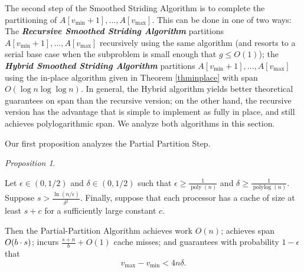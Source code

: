 \documentclass[11pt]{article}
\DeclarePairedDelimiter{\paren}{(}{)}
\newcommand{\poly}{\operatorname{poly}}
\newcommand{\polylog}{\operatorname{polylog}}
\newcommand{\defn}[1]{{\textit{\textbf{\boldmath #1}}} }
\renewcommand{\paragraph}[1]{\vspace{0.09in}\noindent{\bf \boldmath #1.}}
\theoremstyle{remark}
\newtheorem{proposition}[thm]{Proposition}
\theoremstyle{remark}
\begin{document}
The second step of the Smoothed Striding Algorithm is to complete the
partitioning of $A[v_{\text{min}} + 1], \ldots, A[v_{\text{max}}]$. This can be done
in one of two ways: The \defn{Recursive Smoothed Striding Algorithm}
partitions $A[v_{\text{min}} + 1], \ldots, A[v_{\text{max}}]$ recursively using the
same algorithm (and resorts to a serial base case when the subproblem
is small enough that $g \le O(1)$); the \defn{Hybrid Smoothed Striding
  Algorithm} partitions $A[v_{\text{min}} + 1], \ldots, A[v_{\text{max}}]$ using the
in-place algorithm given in Theorem \ref{thminplace} with span $O(\log
n \log \log n)$. In general, the Hybrid algorithm yields better
theoretical guarantees on span than the recursive version; on the
other hand, the recursive version has the advantage that is
simple to implement as fully in place, and still achieves
polylogarithmic span. We analyze both algorithms in this section.



\paragraph{Algorithm Analysis} Our first proposition analyzes the Partial Partition Step.
\begin{proposition}
  \label{prop:generalResult}
  
  Let $\epsilon \in (0, 1/2)$ and $\delta \in (0, 1/2)$ such that
  $\epsilon \ge \frac{1}{\poly(n)}$ and $\delta \ge
  \frac{1}{\polylog(n)}$. Suppose $s > \frac{\ln
    (n/\epsilon)}{\delta^2}$. Finally, suppose that each processor has
  a cache of size at least $s + c$ for a sufficiently large constant
  $c$.

  Then the Partial-Partition Algorithm achieves work $O(n)$; achieves
  span $O\paren*{b \cdot s}$; incurs $\frac{s+n}{b} + O(1)$ cache
  misses; and guarantees with probability $1 - \epsilon$ that
  $$v_{\text{max}}-v_{\text{min}} < 4 n \delta.$$
\end{proposition}
\end{document}
